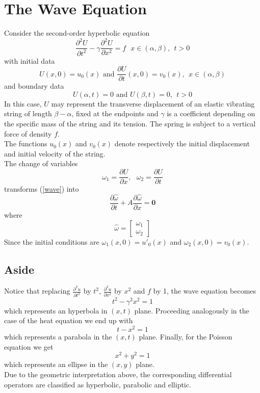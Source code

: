 \section{The Wave Equation}
Consider the second-order hyperbolic equation
\begin{equation}
\label{wave}
\frac{\partial^2 U}{\partial t^2} - \gamma \frac{\partial^2 U}{\partial x^2}=f \ \ \ x \in (\alpha,\beta), \ \ t>0\end{equation}
with initial data
\[U(x,0) = u_0(x) \mbox{   and   } \frac{\partial U}{\partial t}(x,0)=v_0(x), \ \ x\in (\alpha,\beta) \]
and boundary data
\[U(\alpha,t) = 0 \mbox{   and   } U(\beta,t)=0, \ \ t>0 \]
In this case, $U$ may represent the transverse displacement of an elastic vibrating 
string of length $\beta-\alpha$, fixed at the endpoints and $\gamma$ is a coefficient
depending on the specific mass of the string and its tension. The spring is subject to a vertical force of density $f$.\\

The functions $u_0(x)$ and $v_0(x)$ denote respectively the initial displacement and initial velocity of the string.\\
The change of variables
\[\omega_1=\frac{\partial U}{\partial x}, \ \ \ \omega_2 =\frac{\partial U}{\partial t} \]
transforms (\ref{wave}) into 
\[
\frac{\partial \hat{\omega}}{\partial t} +A\frac{\partial \hat{\omega}}{\partial x}= \mathbf{0}
\]
where
\[\hat{\omega}=\left[\begin{array}{c}\omega_1\\ \omega_2\end{array} \right] \]
Since the initial conditions are $\omega_1(x,0)=u'_0(x)$ and $\omega_2(x,0)=v_0(x)$.\\
\subsection*{Aside}
Notice that replacing $\frac{\partial^2 u}{\partial t^2}$ by $t^2$, $\frac{\partial^2u}{\partial x^2}$ by $x^2$ and $f$ by 1, the wave equation becomes
\[t^2-\gamma^2 x^2=1 \]
which represents an hyperbola in $(x,t)$ plane. Proceeding analogously in the case
of the heat equation we end up with 
\[t-x^2=1 \]
which represents a parabola in the $(x,t)$ plane. Finally, for the Poisson
equation we get
\[x^2+y^2=1 \]
which represents an ellipse in the $(x,y)$ plane.\\
Due to the geometric interpretation above, the corresponding differential
operators are classified as hyperbolic, parabolic and elliptic.
